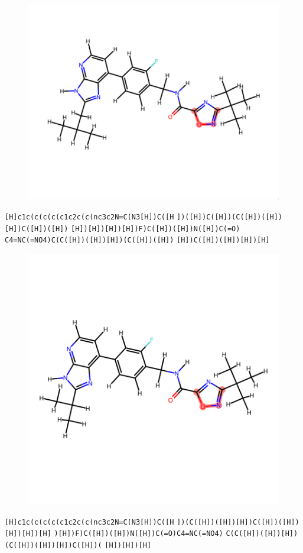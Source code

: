 \documentclass{article}
\begin{document}
\begin{figure}[ht]
\centering
    \includegraphics{mol10.png}
\end{figure}
\verb|[H]c1c(c(c(c(c1c2c(c(nc3c2N=C(N3[H])C([H| \verb|])([H])C([H])(C([H])([H])[H])C([H])([H])| \verb|[H])[H])[H])[H])F)C([H])([H])N([H])C(=O)| \verb|C4=NC(=NO4)C(C([H])([H])[H])(C([H])([H])| \verb|[H])C([H])([H])[H])[H]|

\clearpage

\begin{figure}[ht]
\centering
    \includegraphics{mol11.png}
\end{figure}
\verb|[H]c1c(c(c(c(c1c2c(c(nc3c2N=C(N3[H])C([H| \verb|])(C([H])([H])[H])C([H])([H])[H])[H])[H]| \verb|)[H])F)C([H])([H])N([H])C(=O)C4=NC(=NO4)| \verb|C(C([H])([H])[H])(C([H])([H])[H])C([H])(| \verb|[H])[H])[H]|
\end{document}
